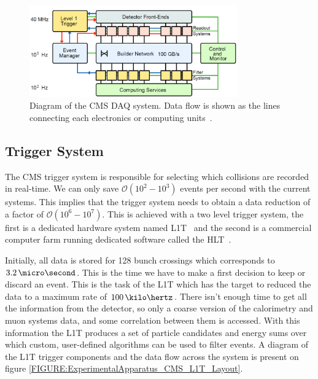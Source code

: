 \begin{figure}[!htb]
  \centering
  \includegraphics[width=0.80\textwidth]{Chapter02/CMS/Images/CMS_DAQ_Diagram.png}
  \caption[Diagram of the CMS DAQ system and its data flow.]
  {Diagram of the \gls{CMS} \gls{DAQ} system. Data flow is shown as the lines connecting each electronics or computing units~\cite{ARTICLE:TheCMSExperiment}.}
  \label{FIGURE:ExperimentalApparatus_CMS_DAQ_Diagram}
\end{figure}

\subsection{Trigger System}
\label{SUBSECTION:ExperimentalApparatus_CMS_Trigger}


The \gls{CMS} trigger system is responsible for selecting which collisions are recorded in real-time. We can only save $\mathcal{O}(10^2-10^3)$ events per second with the current systems. This implies that the trigger system needs to obtain a data reduction of a factor of $\mathcal{O}(10^6-10^7)$. This is achieved with a two level trigger system, the first is a dedicated hardware system named \acrfull{L1T}~\cite{CMSTDR:CMSTridasTDRVol1} and the second is a commercial computer farm running dedicated software called the \gls{HLT}~\cite{CMSTDR:CMSTridasTDRVol2}.

Initially, all data is stored for 128 bunch crossings which corresponds to $3.2\,\micro\second$. This is the time we have to make a first decision to keep or discard an event. This is the task of the \gls{L1T} which has the target to reduced the data to a maximum rate of $100\,\kilo\hertz$. There isn't enough time to get all the information from the detector, so only a coarse version of the calorimetry and muon systems data, and some correlation between them is accessed. With this information the \gls{L1T} produces a set of particle candidates and energy sums over which custom, user-defined algorithms can be used to filter events. A diagram of the \gls{L1T} trigger components and the data flow across the system is present on figure \ref{FIGURE:ExperimentalApparatus_CMS_L1T_Layout}.

